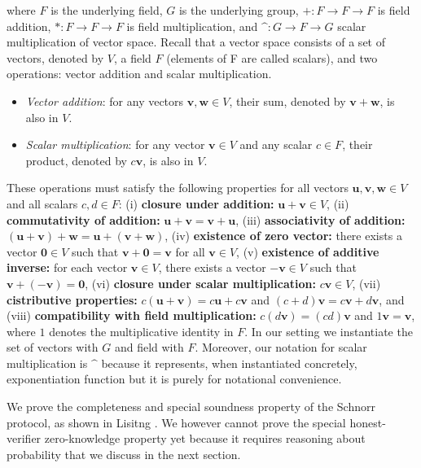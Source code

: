 \documentclass[conference,compsoc]{IEEEtran}
\begin{document}
\noindent
 where $F$ is the underlying field, $G$ is the underlying group,
 $+ : F \rightarrow F \rightarrow F$ is field addition,
 $* : F \rightarrow F \rightarrow F$ is field multiplication, and
 $\mbox{\textasciicircum}: G \rightarrow F \rightarrow G$ scalar multiplication of vector space.  
 Recall that a vector space consists of a set of 
 vectors, denoted by \(V\), a field \(F\) (elements of F are called scalars), and 
 two operations: vector addition and scalar multiplication.
\begin{itemize}
    \item \textit{Vector addition}: for any vectors \(\mathbf{v}, \mathbf{w} \in V\), their sum, denoted by \(\mathbf{v} + \mathbf{w}\), is also in \(V\).
    \item \textit{Scalar multiplication}: for any vector \(\mathbf{v} \in V\) and any scalar \(c \in F\), their product, denoted by \(c\mathbf{v}\), is also in \(V\).
\end{itemize}

These operations must satisfy the following properties for all vectors \(\mathbf{u}, \mathbf{v}, \mathbf{w} \in V\) and all scalars \(c, d \in F\):
(i) \textbf{closure under addition:} \(\mathbf{u} + \mathbf{v} \in V\), (ii) \textbf{commutativity of addition:} \(\mathbf{u} + \mathbf{v} = \mathbf{v} + \mathbf{u}\), 
(iii)  \textbf{associativity of addition:} \((\mathbf{u} + \mathbf{v}) + \mathbf{w} = \mathbf{u} + (\mathbf{v} + \mathbf{w})\), 
(iv) \textbf{existence of zero vector:} there exists a vector \(\mathbf{0} \in V\) such that \(\mathbf{v} + \mathbf{0} = \mathbf{v}\) for all \(\mathbf{v} \in V\), 
(v) \textbf{existence of additive inverse:} for each vector \(\mathbf{v} \in V\), there exists a vector \(-\mathbf{v} \in V\) such that \(\mathbf{v} + (-\mathbf{v}) = \mathbf{0}\),
(vi) \textbf{closure under scalar multiplication:} \(c\mathbf{v} \in V\), 
(vii) \textbf{cistributive properties:} \(c(\mathbf{u} + \mathbf{v}) = c\mathbf{u} + c\mathbf{v}\) and \((c + d)\mathbf{v} = c\mathbf{v} + d\mathbf{v}\), 
and (viii) \textbf{compatibility with field multiplication:} \(c(d\mathbf{v}) = (cd)\mathbf{v}\) and \(1\mathbf{v} = \mathbf{v}\), where \(1\) denotes the multiplicative identity in \(F\).
In our setting we instantiate the set of vectors with $G$ and field with $F$. 
Moreover, our notation for scalar multiplication is $\mbox{\textasciicircum}$ because it represents, 
when instantiated concretely, exponentiation function but it is purely for notational convenience. 


We prove the completeness and special soundness property of the Schnorr protocol, 
as shown in Lisitng \cite{comp_sound}. We however cannot prove the special honest-verifier 
zero-knowledge property yet because it requires reasoning about probability that 
we discuss in the next section. 
  
\end{document}
